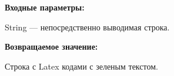\textbf{Входные параметры:}

String --- непосредственно выводимая строка.

\textbf{Возвращаемое значение:}

Строка с Latex кодами с зеленым текстом.